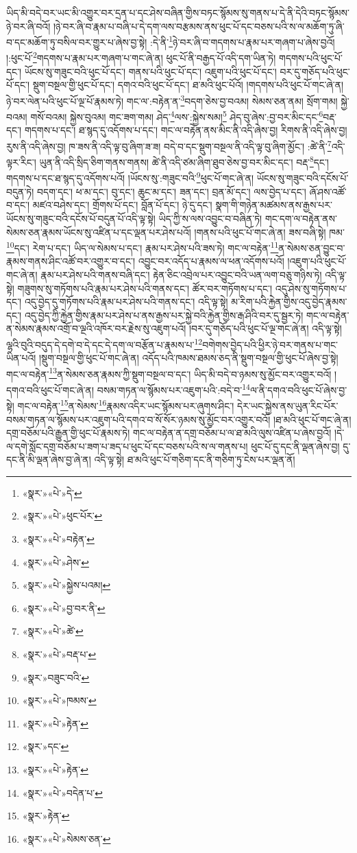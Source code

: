 ཡིད་མི་བདེ་བར་ཡང་མི་འགྱུར་བར་དྲན་པ་དང་ཤེས་བཞིན་གྱིས་བཏང་སྙོམས་སུ་གནས་པ་དེ་ནི་དེའི་བཏང་སྙོམས་ཉེ་བར་ཞི་བའོ། །ཉེ་བར་ཞི་བ་རྣམ་པ་བཞི་པ་དེ་དག་ལས་བརྩམས་ནས་ཕུང་པོ་དང་བཅས་པའི་ས་ལ་མཆོག་ཏུ་ཞི་བ་དང་མཆོག་ཏུ་བསིལ་བར་གྱུར་པ་ཞེས་བྱ་སྟེ། :དེ་ནི་\footnote{«སྣར་»«པེ་»དེ་}ཉེ་བར་ཞི་བ་གདགས་པ་རྣམ་པར་གཞག་པ་ཞེས་བྱའོ། །:ཕུང་པོ་\footnote{«སྣར་»«པེ་»ཕུང་པོར་}གདགས་པ་རྣམ་པར་གཞག་པ་གང་ཞེ་ན། ཕུང་པོ་ནི་བརྒྱད་པོ་འདི་དག་ཡིན་ཏེ། གདགས་པའི་ཕུང་པོ་དང་། ཡོངས་སུ་གཟུང་བའི་ཕུང་པོ་དང་། གནས་པའི་ཕུང་པོ་དང་། འཇུག་པའི་ཕུང་པོ་དང་། བར་དུ་གཅོད་པའི་ཕུང་པོ་དང་། སྡུག་བསྔལ་གྱི་ཕུང་པོ་དང་། དགའ་བའི་ཕུང་པོ་དང་། ཐ་མའི་ཕུང་པོའོ། །གདགས་པའི་ཕུང་པོ་གང་ཞེ་ན། ཉེ་བར་ལེན་པའི་ཕུང་པོ་ལྔ་པོ་རྣམས་ཏེ། གང་ལ་:བརྟེན་ན་\footnote{«སྣར་»«པེ་»བརྟེན་}བདག་ཅེས་བྱ་བའམ། སེམས་ཅན་ནམ། སྲོག་གམ། སྐྱེ་བའམ། གསོ་བའམ། སྐྱེས་བུའམ། གང་ཟག་གམ། ཤེད་\footnote{«སྣར་»«པེ་»ཤེས་}ལས་:སྐྱེས་སམ།\footnote{«སྣར་»«པེ་»སྐྱེས་པའམ།} ཤེད་བུ་ཞེས་:བྱ་བར་མིང་དང་\footnote{«སྣར་»«པེ་»བྱ་བར་ནི་}བརྡ་དང་། གདགས་པ་དང་། ཐ་སྙད་དུ་འདོགས་པ་དང་། གང་ལ་བརྟེན་ནས་མིང་ནི་འདི་ཞེས་བྱ། རིགས་ནི་འདི་ཞེས་བྱ། རུས་ནི་འདི་ཞེས་བྱ། ཁ་ཟས་ནི་འདི་ལྟ་བུ་ཞིག་ཟ་ཟ། བདེ་བ་དང་སྡུག་བསྔལ་ནི་འདི་ལྟ་བུ་ཞིག་མྱོང་། :ཚེ་ནི་\footnote{«སྣར་»«པེ་»ཚེ་}འདི་ལྟར་རིང་། ཡུན་ནི་འདི་སྲིད་ཅིག་གནས་གནས། ཚེ་ནི་འདི་ཙམ་ཞིག་ཐུབ་ཅེས་བྱ་བར་མིང་དང་། བརྡ་\footnote{«སྣར་»«པེ་»བརྡ་པ་}དང་། གདགས་པ་དང་ཐ་སྙད་དུ་འདོགས་པའོ། །ཡོངས་སུ་:གཟུང་བའི་\footnote{«སྣར་»བཟུང་བའི་}ཕུང་པོ་གང་ཞེ་ན། ཡོངས་སུ་གཟུང་བའི་དངོས་པོ་བདུན་ཏེ། བདག་དང་། ཕ་མ་དང་། བུ་དང་། ཆུང་མ་དང་། ཟན་དང་། བྲན་མོ་དང་། ལས་བྱེད་པ་དང་། ཞོ་ཤས་འཚོ་བ་དང་། མཛའ་བཤེས་དང་། གྲོགས་པོ་དང་། བློན་པོ་དང་། ཉེ་དུ་དང་། སྣག་གི་གཉེན་མཚམས་ནས་རྒྱས་པར་ཡོངས་སུ་གཟུང་བའི་དངོས་པོ་བདུན་པོ་འདི་ལྟ་སྟེ། ཡིད་ཀྱི་ས་ལས་འབྱུང་བ་བཞིན་ཏེ། གང་དག་ལ་བརྟེན་ནས་སེམས་ཅན་རྣམས་ཡོངས་སུ་འཛིན་པ་དང་ལྡན་པར་ཤེས་པའོ། །གནས་པའི་ཕུང་པོ་གང་ཞེ་ན། ཟས་བཞི་སྟེ། ཁམ་\footnote{«སྣར་»«པེ་»ཁམས་}དང་། རེག་པ་དང་། ཡིད་ལ་སེམས་པ་དང་། རྣམ་པར་ཤེས་པའི་ཟས་ཏེ། གང་ལ་བརྟེན་\footnote{«སྣར་»«པེ་»རྟེན་}ན་སེམས་ཅན་བྱུང་བ་རྣམས་གནས་ཤིང་འཚོ་བར་འགྱུར་བ་དང་། འབྱུང་བར་འདོད་པ་རྣམས་ལ་ཕན་འདོགས་པའོ། །འཇུག་པའི་ཕུང་པོ་གང་ཞེ་ན། རྣམ་པར་ཤེས་པའི་གནས་བཞི་དང་། རྟེན་ཅིང་འབྲེལ་པར་འབྱུང་བའི་ཡན་ལག་བཅུ་གཉིས་ཏེ། འདི་ལྟ་སྟེ། གཟུགས་སུ་གཏོགས་པའི་རྣམ་པར་ཤེས་པའི་གནས་དང་། ཚོར་བར་གཏོགས་པ་དང་། འདུ་ཤེས་སུ་གཏོགས་པ་དང་། འདུ་བྱེད་དུ་གཏོགས་པའི་རྣམ་པར་ཤེས་པའི་གནས་དང་། འདི་ལྟ་སྟེ། མ་རིག་པའི་རྐྱེན་གྱིས་འདུ་བྱེད་རྣམས་དང་། འདུ་བྱེད་ཀྱི་རྐྱེན་གྱིས་རྣམ་པར་ཤེས་པ་ནས་རྒྱས་པར་སྐྱེ་བའི་རྐྱེན་གྱིས་རྒ་ཤིའི་བར་དུ་སྦྱར་ཏེ། གང་ལ་བརྟེན་ན་སེམས་རྣམས་འགྲོ་བ་ལྔའི་འཁོར་བར་རྗེས་སུ་འཇུག་པའོ། །བར་དུ་གཅོད་པའི་ཕུང་པོ་ལྔ་གང་ཞེ་ན། འདི་ལྟ་སྟེ། ལྷའི་བུའི་བདུད་དེ་དགེ་བ་དེ་དང་དེ་དག་ལ་བརྩོན་པ་རྣམས་པ་\footnote{«སྣར་»དང་}བགེགས་བྱེད་པའི་ཕྱིར་ཉེ་བར་གནས་པ་གང་ཡིན་པའོ། །སྡུག་བསྔལ་གྱི་ཕུང་པོ་གང་ཞེ་ན། འདོད་པའི་ཁམས་ཐམས་ཅད་ནི་སྡུག་བསྔལ་གྱི་ཕུང་པོ་ཞེས་བྱ་སྟེ། གང་ལ་བརྟེན་\footnote{«སྣར་»«པེ་»རྟེན་}ན་སེམས་ཅན་རྣམས་ཀྱི་སྡུག་བསྔལ་བ་དང་། ཡིད་མི་བདེ་བ་ཉམས་སུ་མྱོང་བར་འགྱུར་བའོ། །དགའ་བའི་ཕུང་པོ་གང་ཞེ་ན། བསམ་གཏན་ལ་སྙོམས་པར་འཇུག་པའི་:བདེ་བ་\footnote{«སྣར་»«པེ་»བདེན་པ་}ལ་ནི་དགའ་བའི་ཕུང་པོ་ཞེས་བྱ་སྟེ། གང་ལ་བརྟེན་\footnote{«སྣར་»རྟེན་}ན་སེམས་\footnote{«སྣར་»«པེ་»སེམས་ཅན་}རྣམས་འདིར་ཡང་སྙོམས་པར་ཞུགས་ཤིང་། དེར་ཡང་སྐྱེས་ནས་ཡུན་རིང་པོར་བསམ་གཏན་ལ་སྙོམས་པར་འཇུག་པའི་དགའ་བ་སོ་སོར་ཉམས་སུ་མྱོང་བར་འགྱུར་བའོ། །ཐ་མའི་ཕུང་པོ་གང་ཞེ་ན། དགྲ་བཅོམ་པའི་རྒྱུན་གྱི་ཕུང་པོ་རྣམས་ཏེ། གང་ལ་བརྟེན་ན་དགྲ་བཅོམ་པ་ལ་ཐ་མའི་ལུས་འཛིན་པ་ཞེས་བྱའོ། །དེ་ལ་དགེ་སློང་དགྲ་བཅོམ་པ་ཟག་པ་ཟད་པ་ཕུང་པོ་དང་བཅས་པའི་ས་ལ་གནས་པ། ཕུང་པོ་དུ་དང་ནི་ལྡན་ཞེས་བྱ། དུ་དང་ནི་མི་ལྡན་ཞེས་བྱ་ཞེ་ན། འདི་ལྟ་སྟེ། ཐ་མའི་ཕུང་པོ་གཅིག་དང་ནི་གཅིག་ཏུ་ངེས་པར་ལྡན་ནོ། 